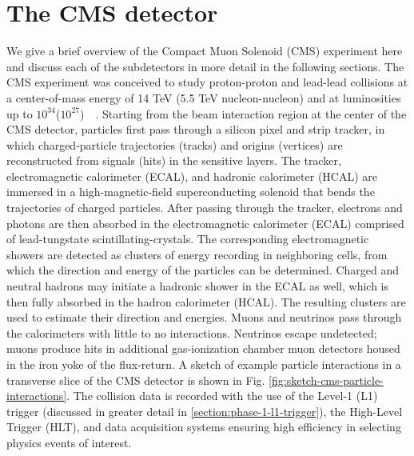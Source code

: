 \section{The CMS detector}
\label{section:cms-detector}
We give a brief overview of the Compact Muon Solenoid (CMS) experiment here and discuss each of the subdetectors in more detail in the following sections. The CMS experiment was conceived to study proton-proton and lead-lead collisions at a center-of-mass energy of 14 TeV (5.5 TeV nucleon-nucleon) and at luminosities up to $10^{34}$\percms ($10^{27}$\percms)~\cite{CMS-2008-JINST-3-S08004}~\cite{CERN-EP-2017-110}. Starting from the beam interaction region at the center of the CMS detector, particles first pass through a silicon pixel and strip tracker, in which charged-particle trajectories (tracks) and origins (vertices) are reconstructed from signals (hits) in the sensitive layers. The tracker, electromagnetic calorimeter (ECAL), and hadronic calorimeter (HCAL) are immersed in a high-magnetic-field superconducting solenoid that bends the trajectories of charged particles. After passing through the tracker, electrons and photons are then absorbed in the electromagnetic calorimeter (ECAL) comprised of lead-tungstate scintillating-crystals. The corresponding electromagnetic showers are detected as clusters of energy recording in neighboring cells, from which the direction and energy of the particles can be determined. Charged and neutral hadrons may initiate a hadronic shower in the ECAL as well, which is then fully absorbed in the hadron calorimeter (HCAL). The resulting clusters are used to estimate their direction and energies. Muons and neutrinos pass through the calorimeters with little to no interactions. Neutrinos escape undetected; muons produce hits in additional gas-ionization chamber muon detectors housed in the iron yoke of the flux-return. A sketch of example particle interactions in a transverse slice of the CMS detector is shown in Fig. \ref{fig:sketch-cms-particle-interactions}. The collision data is recorded with the use of the Level-1 (L1) trigger (discussed in greater detail in \ref{section:phase-1-l1-trigger}), the High-Level Trigger (HLT), and data acquisition systems ensuring high efficiency in selecting physics events of interest. 

